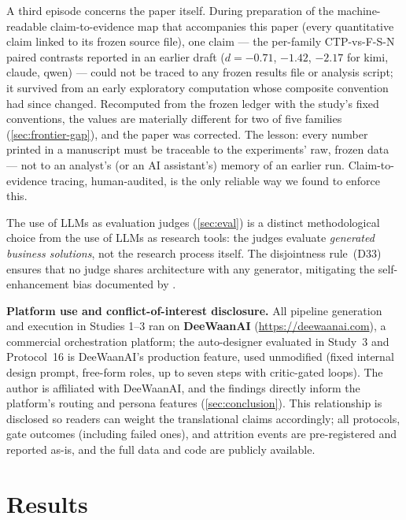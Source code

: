 \documentclass[12pt,a4paper]{article}
\begin{document}
A third episode concerns the paper itself. During preparation of the
machine-readable claim-to-evidence map that accompanies this paper (every
quantitative claim linked to its frozen source file), one claim --- the
per-family CTP-vs-F-S-N paired contrasts reported in an earlier draft
($d = -0.71$, $-1.42$, $-2.17$ for kimi, claude, qwen) --- could not be
traced to any frozen results file or analysis script; it survived from an
early exploratory computation whose composite convention had since changed.
Recomputed from the frozen ledger with the study's fixed conventions, the
values are materially different for two of five families
(\cref{sec:frontier-gap}), and the paper was corrected. The lesson: every
number printed in a manuscript must be traceable to the experiments' raw,
frozen data --- not to an analyst's (or an AI assistant's) memory of an
earlier run. Claim-to-evidence tracing, human-audited, is the only reliable
way we found to enforce this.

The use of LLMs as evaluation judges (\cref{sec:eval}) is a distinct
methodological choice from the use of LLMs as research tools: the judges
evaluate \emph{generated business solutions}, not the research process itself.
The disjointness rule~(D33) ensures that no judge shares architecture with any
generator, mitigating the self-enhancement bias documented by
\citet{ZhengEtAl2023}.

\textbf{Platform use and conflict-of-interest disclosure.} All pipeline
generation and execution in Studies 1--3 ran on \textbf{DeeWaanAI}
(\url{https://deewaanai.com}), a commercial orchestration platform; the
auto-designer evaluated in Study~3 and Protocol~16 is DeeWaanAI's production
feature, used unmodified (fixed internal design prompt, free-form roles,
up to seven steps with critic-gated loops). The author is affiliated with
DeeWaanAI, and the findings directly inform the platform's routing and
persona features (\cref{sec:conclusion}). This relationship is disclosed so
readers can weight the translational claims accordingly; all protocols,
gate outcomes (including failed ones), and attrition events are
pre-registered and reported as-is, and the full data and code are publicly
available.

\section{Results}\label{sec:results}
\end{document}

